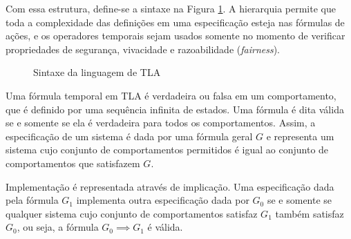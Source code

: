 Com essa estrutura, define-se a sintaxe na Figura \ref{fig:sintaxe-tla}. A hierarquia permite que toda a complexidade das definições em uma especificação esteja nas fórmulas de ações, e os operadores temporais sejam usados somente no momento de verificar propriedades de segurança, vivacidade e razoabilidade (\textit{fairness}).

\begin{figure}[h]
  \centering
  \caption{Sintaxe da linguagem de TLA}
\label{fig:sintaxe-tla}
\end{figure}

Uma fórmula temporal em TLA é verdadeira ou falsa em um comportamento, que é definido por uma sequência infinita de estados. Uma fórmula é dita válida se e somente se ela é verdadeira para todos os comportamentos. Assim, a especificação de um sistema é dada por uma fórmula geral $G$ e representa um sistema cujo conjunto de comportamentos permitidos é igual ao conjunto de comportamentos que satisfazem $G$.

Implementação é representada através de implicação. Uma especificação dada pela fórmula $G_1$ implementa outra especificação dada por $G_0$ se e somente se qualquer sistema cujo conjunto de comportamentos satisfaz $G_1$ também satisfaz $G_0$, ou seja, a fórmula $G_0 \implies G_1$ é válida.

